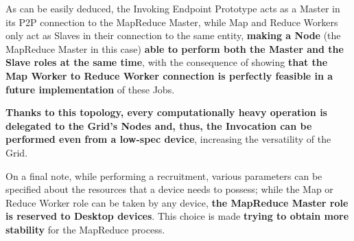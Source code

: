 As can be easily deduced, the Invoking Endpoint Prototype acts as a Master in its P2P connection to the MapReduce Master, while Map and Reduce Workers only act as Slaves in their connection to the same entity, \textbf{making a Node} (the MapReduce Master in this case) \textbf{able to perform both the Master and the Slave roles at the same time}, with the consequence of showing \textbf{that the Map Worker to Reduce Worker connection is perfectly feasible in a future implementation} of these Jobs.

\textbf{Thanks to this topology, every computationally heavy operation is delegated to the Grid's Nodes and, thus, the Invocation can be performed even from a low-spec device}, increasing the versatility of the Grid. 

On a final note, while performing a recruitment, various parameters can be specified about the resources that a device needs to possess; while the Map or Reduce Worker role can be taken by any device, \textbf{the MapReduce Master role is reserved to Desktop devices}. This choice is made \textbf{trying to obtain more stability} for the MapReduce process.  
